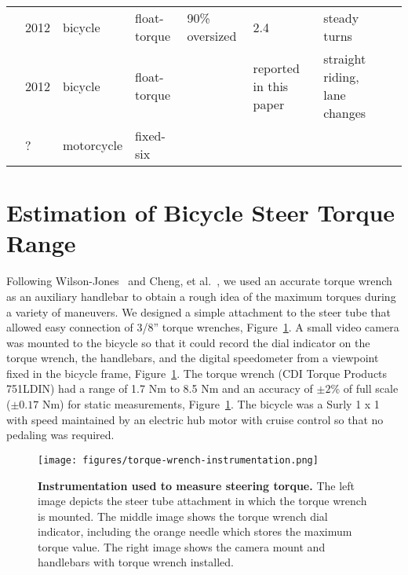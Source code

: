\documentclass[10pt]{article}
\begin{document}
\begin{landscape}
\begin{table}
\begin{tabular}{llllllll}
    \cite{Cain2010,Cain2012}              &  2012 &     bicycle &      float-torque &    90\% oversized &                      2.4 &                            steady turns &             \\
    \cite{Moore2012}                      &  2012 &     bicycle &      float-torque &                   &   reported in this paper &           straight riding, lane changes &             \\
    \cite{Kageyama}                       &     ? &  motorcycle &         fixed-six &                   &                          &                                         &             \\
    \bottomrule
  \end{tabular}
  \label{tab:design}
\end{table}
\end{landscape}

\section*{Estimation of Bicycle Steer Torque Range}

Following Wilson-Jones~\cite{Wilson-Jones1951} and Cheng, et al.~\cite{Cheng2003},
 we used an accurate torque wrench as an auxiliary handlebar to obtain
a rough idea of the maximum torques during a variety of maneuvers. We
designed a simple attachment to the steer tube that allowed easy connection of
3/8'' torque wrenches, Figure~\ref{fig:torque-wrench-instrumentation}. A small
video camera was mounted to the bicycle so that it could record the dial
indicator on the torque wrench, the handlebars, and the digital speedometer
from a viewpoint fixed in the bicycle frame,
Figure~\ref{fig:torque-wrench-instrumentation}.  The torque wrench (CDI Torque
Products 751LDIN) had a range of 1.7 Nm to 8.5 Nm and an accuracy of $\pm2$\% of
full scale ($\pm0.17$ Nm) for static measurements,
Figure~\ref{fig:torque-wrench-instrumentation}. The bicycle was a Surly 1 x 1
with speed maintained by an electric hub motor with
cruise control so that no pedaling was required.

\begin{figure}
  \centering
  \texttt{[image: figures/torque-wrench-instrumentation.png]}
  \caption{{\bf Instrumentation used to measure steering torque.}
    The left image depicts the steer tube attachment in which the torque wrench
    is mounted. The middle image shows the torque wrench dial indicator,
    including the orange needle which stores the maximum torque value. The right
    image shows the camera mount and handlebars with torque wrench
    installed.
    }
  \label{fig:torque-wrench-instrumentation}
\end{figure}
\end{document}
